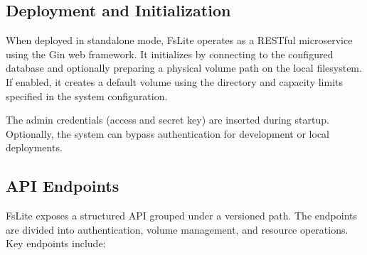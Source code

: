 \subsection{Deployment and Initialization}

When deployed in standalone mode, FsLite operates as a RESTful microservice using the Gin web framework. It initializes by connecting to the configured database and optionally preparing a physical volume path on the local filesystem. If enabled, it creates a default volume using the directory and capacity limits specified in the system configuration.

The admin credentials (access and secret key) are inserted during startup. Optionally, the system can bypass authentication for development or local deployments.

\subsection{API Endpoints}

FsLite exposes a structured API grouped under a versioned path. The endpoints are divided into authentication, volume management, and resource operations. Key endpoints include:

\begin{table}[H]
\centering
{}
\caption{FsLite public API endpoints}
\label{tab:fslite-public-endpoints}
\end{table}

